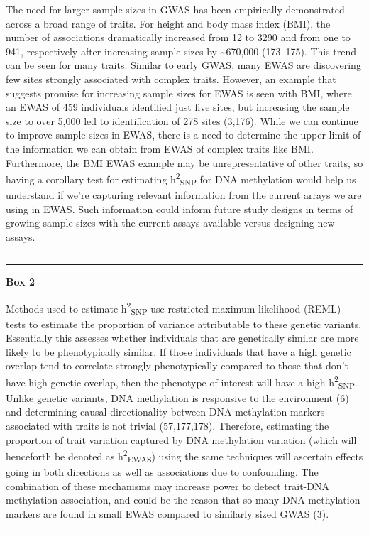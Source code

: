 \documentclass[11pt,oneside]{bristolthesis}
\begin{document}
The need for larger sample sizes in GWAS has been empirically demonstrated across a broad range of traits. For height and body mass index (BMI), the number of associations dramatically increased from 12 to 3290 and from one to 941, respectively after increasing sample sizes by \textasciitilde670,000 (173--175). This trend can be seen for many traits. Similar to early GWAS, many EWAS are discovering few sites strongly associated with complex traits. However, an example that suggests promise for increasing sample sizes for EWAS is seen with BMI, where an EWAS of 459 individuals identified just five sites, but increasing the sample size to over 5,000 led to identification of 278 sites (3,176). While we can continue to improve sample sizes in EWAS, there is a need to determine the upper limit of the information we can obtain from EWAS of complex traits like BMI. Furthermore, the BMI EWAS example may be unrepresentative of other traits, so having a corollary test for estimating h\textsuperscript{2}\textsubscript{SNP} for DNA methylation would help us understand if we're capturing relevant information from the current arrays we are using in EWAS. Such information could inform future study designs in terms of growing sample sizes with the current assays available versus designing new assays.
\begin{center}\rule{0.5\linewidth}{0.5pt}\end{center}
\begin{center}\rule{0.5\linewidth}{0.5pt}\end{center}

\textbf{Box 2}

Methods used to estimate h\textsuperscript{2}\textsubscript{SNP} use restricted maximum likelihood (REML) tests to estimate the proportion of variance attributable to these genetic variants. Essentially this assesses whether individuals that are genetically similar are more likely to be phenotypically similar. If those individuals that have a high genetic overlap tend to correlate strongly phenotypically compared to those that don't have high genetic overlap, then the phenotype of interest will have a high h\textsuperscript{2}\textsubscript{SNP}. Unlike genetic variants, DNA methylation is responsive to the environment (6) and determining causal directionality between DNA methylation markers associated with traits is not trivial (57,177,178). Therefore, estimating the proportion of trait variation captured by DNA methylation variation (which will henceforth be denoted as h\textsuperscript{2}\textsubscript{EWAS}) using the same techniques will ascertain effects going in both directions as well as associations due to confounding. The combination of these mechanisms may increase power to detect trait-DNA methylation association, and could be the reason that so many DNA methylation markers are found in small EWAS compared to similarly sized GWAS (3).
\begin{center}\rule{0.5\linewidth}{0.5pt}\end{center}
\end{document}
